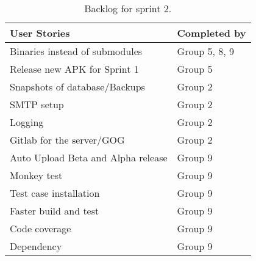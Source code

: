 \begin{table}
	\centering
	\begin{tabular}{ll}
		\textbf{User Stories} & \textbf{Completed by}\\ \hline \noalign{\vskip 2mm}
		Binaries instead of submodules & Group 5, 8, 9\\ \hline
		Release new APK for Sprint 1 & Group 5\\ \hline
		Snapshots of database/Backups & Group 2\\ \hline
		SMTP setup & Group 2\\ \hline
		Logging & Group 2\\ \hline
		Gitlab for the server/GOG & Group 2\\ \hline
		Auto Upload Beta and Alpha release & Group 9\\ \hline
		Monkey test & Group 9\\ \hline
		Test case installation & Group 9\\ \hline
		Faster build and test & Group 9\\ \hline
		Code coverage & Group 9\\ \hline
		Dependency & Group 9\\ \hline
	\end{tabular}
	\caption{Backlog for sprint 2.}
	\label{Sprint3_ReleaseBacklogSprint2_table}
\end{table}